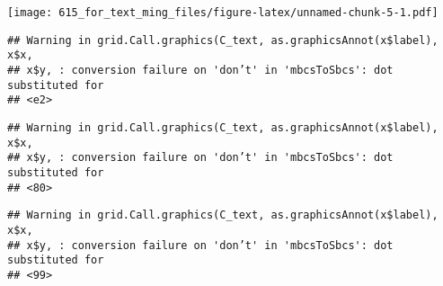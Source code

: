 \documentclass[]{article}
\newenvironment{Shaded}{\begin{snugshade}}{\end{snugshade}}
\newcommand{\KeywordTok}[1]{\textcolor[rgb]{0.13,0.29,0.53}{\textbf{{#1}}}}
\newcommand{\DataTypeTok}[1]{\textcolor[rgb]{0.13,0.29,0.53}{{#1}}}
\newcommand{\DecValTok}[1]{\textcolor[rgb]{0.00,0.00,0.81}{{#1}}}
\newcommand{\StringTok}[1]{\textcolor[rgb]{0.31,0.60,0.02}{{#1}}}
\newcommand{\CommentTok}[1]{\textcolor[rgb]{0.56,0.35,0.01}{\textit{{#1}}}}
\newcommand{\OtherTok}[1]{\textcolor[rgb]{0.56,0.35,0.01}{{#1}}}
\newcommand{\NormalTok}[1]{{#1}}
\begin{document}
\texttt{[image: 615\_for\_text\_ming\_files/figure-latex/unnamed-chunk-5-1.pdf]}

\begin{Shaded}
\end{Shaded}

\begin{verbatim}
## Warning in grid.Call.graphics(C_text, as.graphicsAnnot(x$label), x$x,
## x$y, : conversion failure on 'don’t' in 'mbcsToSbcs': dot substituted for
## <e2>
\end{verbatim}

\begin{verbatim}
## Warning in grid.Call.graphics(C_text, as.graphicsAnnot(x$label), x$x,
## x$y, : conversion failure on 'don’t' in 'mbcsToSbcs': dot substituted for
## <80>
\end{verbatim}

\begin{verbatim}
## Warning in grid.Call.graphics(C_text, as.graphicsAnnot(x$label), x$x,
## x$y, : conversion failure on 'don’t' in 'mbcsToSbcs': dot substituted for
## <99>
\end{verbatim}
\end{document}
